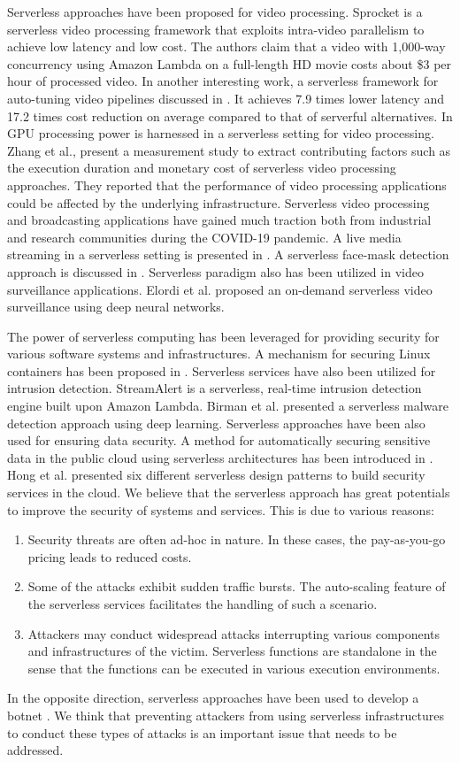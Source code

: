 Serverless approaches have been proposed for video processing. Sprocket  is a serverless video processing framework that exploits intra-video parallelism
to achieve low latency and low cost. The authors claim that a video with 1,000-way concurrency using Amazon Lambda on a full-length HD movie costs about \$3 per hour of processed video. In another interesting work, a serverless framework
for auto-tuning video pipelines discussed in . It achieves 7.9 times lower latency and 17.2 times cost reduction on average compared to that of serverful alternatives. In   GPU processing power is harnessed in a serverless setting for video processing. Zhang et al.,  present a measurement study to extract contributing factors such as the execution duration and monetary cost of serverless video processing approaches. They reported that the performance of video processing applications could be affected by the underlying infrastructure.
Serverless video processing and broadcasting applications have gained much traction both from industrial and research communities during the COVID-19 pandemic. A live media streaming in a serverless setting is presented in . A serverless face-mask detection approach is discussed in . Serverless paradigm also has been utilized in video surveillance applications. Elordi et al.  proposed an on-demand serverless video surveillance using deep neural networks.

The power of serverless computing has been leveraged for providing security for various software systems and infrastructures. A mechanism for securing Linux containers has been proposed in . Serverless services have also been utilized for intrusion detection. StreamAlert  is a serverless, real-time intrusion detection engine built upon Amazon Lambda. Birman et al.  presented a serverless malware detection approach using deep learning.
Serverless approaches have been also used for ensuring data security. A method for automatically securing sensitive data in the public cloud using serverless architectures has been introduced in . Hong et al.  presented six different serverless design patterns to build security services in the cloud. 
We believe that the serverless approach has great potentials to improve the security of systems and services. This is due to various reasons:
\begin{enumerate}
    \item Security threats are often ad-hoc in nature. In these cases, the pay-as-you-go pricing leads to reduced costs.
    \item Some of the attacks exhibit sudden traffic bursts. The auto-scaling feature of the serverless services facilitates the handling of such a scenario. 
    \item Attackers may conduct widespread attacks interrupting various components and infrastructures of the victim. Serverless functions are standalone in the sense that the functions can be executed in various execution environments.
\end{enumerate}
In the opposite direction, serverless approaches have been used to develop a botnet . We think that preventing attackers from using serverless infrastructures to conduct these types of attacks is an important issue that needs to be addressed.

